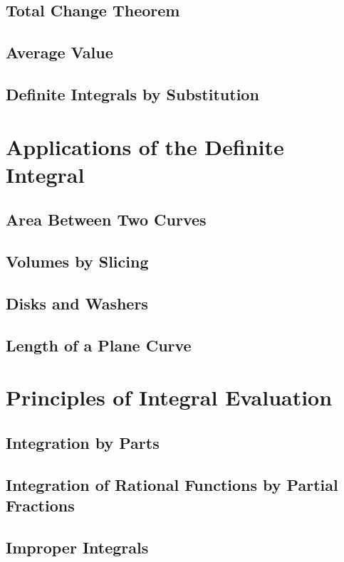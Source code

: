 \documentclass[letterpaper]{report}
\theoremstyle{definition}
\begin{document}
\section{Total Change Theorem}
\section{Average Value}
\section{Definite Integrals by Substitution}

\chapter{Applications of the Definite Integral}
\section{Area Between Two Curves}
\section{Volumes by Slicing}
\section{Disks and Washers}
\section{Length of a Plane Curve}

\chapter{Principles of Integral Evaluation}
\section{Integration by Parts}
\section{Integration of Rational Functions by Partial Fractions}
\section{Improper Integrals}

\end{document}
